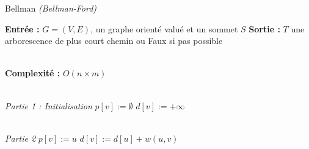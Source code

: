 \documentclass{article}      %
\begin{document}
\begin{algorithm} \caption{Bellman \textit{(Bellman-Ford)}}
\begin{algorithmic}

\State \textbf{Entrée :} $G = (V, E)$, un graphe orienté valué et un sommet $S$
\State \textbf{Sortie :} $T$ une arborescence de plus court chemin ou Faux si pas possible

\\ \State \textbf{Complexité :} $O(n\times m)$

\\ \State \textit{Partie 1 : Initialisation}
    \State $p[v] := \emptyset$
    \State $d[v] := +\infty$
\EndFor


\\ \State \textit{Partie 2}
            \State $p[v] := u$
            \State $d[v] := d[u] + w(u, v)$
        \Endif
    \EndFor
\EndFor
\end{algorithmic}
\end{algorithm}
\end{document}
